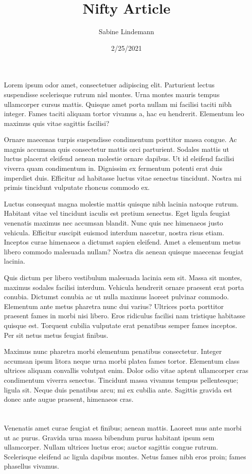 \documentclass[a4paper]{article}
\title{Nifty Article}
\author{Sabine Lindemann}
\date{2/25/2021}
\begin{document}
\maketitle
Lorem ipsum odor amet, consectetuer adipiscing elit. Parturient lectus suspendisse scelerisque rutrum nisl montes. Urna montes mauris tempus ullamcorper cursus mattis. Quisque amet porta nullam mi facilisi taciti nibh integer. Fames taciti aliquam tortor vivamus a, hac eu hendrerit. Elementum leo maximus quis vitae sagittis facilisi?



Ornare maecenas turpis suspendisse condimentum porttitor massa congue. Ac magnis accumsan quis consectetur mattis orci parturient. Sodales mattis ut luctus placerat eleifend aenean molestie ornare dapibus. Ut id eleifend facilisi viverra quam condimentum in. Dignissim ex fermentum potenti erat duis imperdiet duis. Efficitur ad habitasse luctus vitae senectus tincidunt. Nostra mi primis tincidunt vulputate rhoncus commodo ex.

                                   Luctus consequat magna molestie mattis quisque nibh lacinia natoque rutrum. Habitant vitae vel tincidunt iaculis est pretium senectus. Eget ligula feugiat venenatis maximus nec accumsan blandit. Nunc quis nec himenaeos justo vehicula. Efficitur suscipit euismod interdum nascetur, nostra risus etiam. Inceptos curae himenaeos a dictumst sapien eleifend. Amet a elementum metus libero commodo malesuada nullam? Nostra dis aenean quisque maecenas feugiat lacinia.

Quis dictum per libero vestibulum malesuada lacinia sem sit. Massa sit montes, maximus sodales          facilisi interdum. Vehicula hendrerit ornare praesent erat porta conubia. Dictumst conubia ac ut nulla maximus laoreet pulvinar commodo. Elementum ante metus pharetra nunc dui varius?                     Ultrices porta porttitor praesent fames in morbi nisi libero. Eros ridiculus facilisi nam tristique habitasse quisque est. Torquent                  cubilia vulputate erat penatibus semper fames inceptos. Per sit netus metus feugiat finibus.

Maximus nunc pharetra morbi elementum penatibus consectetur. Integer accumsan ipsum litora neque urna morbi platea fames tortor. Elementum class ultrices aliquam convallis volutpat enim. Dolor odio vitae aptent ullamcorper cras condimentum viverra senectus. Tincidunt massa vivamus tempus pellentesque; ligula sit. Neque duis penatibus arcu; mi ex cubilia ante. Sagittis gravida est donec ante augue praesent, himenaeos cras.\\\\\\Venenatis amet curae feugiat et finibus; aenean mattis. Laoreet mus ante morbi ut ac purus. Gravida urna massa bibendum purus habitant ipsum sem ullamcorper. Nullam ultrices luctus eros; auctor sagittis congue rutrum. Scelerisque eleifend ac ligula dapibus montes. Netus fames nibh eros proin; fames phasellus vivamus.
\end{document}
